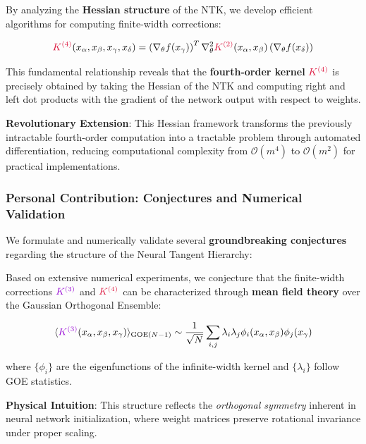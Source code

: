 \documentclass[a4paper]{article}
\theoremstyle{plain}
\theoremstyle{definition}
\theoremstyle{remark}
\begin{document}
\begin{tcolorbox}[colback=kernelcolor!10,colframe=kernelcolor!60!black,title={\textbf{Hessian Framework: Computational Breakthrough}},enhanced,drop shadow]
By analyzing the \textbf{Hessian structure} of the NTK, we develop efficient algorithms for computing finite-width corrections:

\begin{equation}
\label{eq:hessian_ntk_k4}
\textcolor{kernelcolor}{K^{(4)}}(x_\alpha, x_\beta, x_\gamma, x_\delta) = \left(\nabla_\theta f(x_\gamma)\right)^T \nabla^2_{\theta} \textcolor{kernelcolor}{K^{(2)}}(x_\alpha, x_\beta) \left(\nabla_\theta f(x_\delta)\right)
\end{equation}

This fundamental relationship reveals that the \textbf{fourth-order kernel} $\textcolor{kernelcolor}{K^{(4)}}$ is precisely obtained by taking the Hessian of the NTK and computing right and left dot products with the gradient of the network output with respect to weights.

\textbf{Revolutionary Extension}: This Hessian framework transforms the previously intractable fourth-order computation into a tractable problem through automated differentiation, reducing computational complexity from $\mathcal{O}(m^4)$ to $\mathcal{O}(m^2)$ for practical implementations.
\end{tcolorbox}

\subsubsection{Personal Contribution: Conjectures and Numerical Validation}

We formulate and numerically validate several \textbf{groundbreaking conjectures} regarding the structure of the Neural Tangent Hierarchy:

\begin{tcolorbox}[colback=kernelcolor!10,colframe=kernelcolor!60!black,title={\textbf{Conjecture: Mean GOE Structure for NTH Corrections}},enhanced,drop shadow]
Based on extensive numerical experiments, we conjecture that the finite-width corrections $\textcolor{k3color}{K^{(3)}}$ and $\textcolor{kernelcolor}{K^{(4)}}$ can be characterized through \textbf{mean field theory} over the Gaussian Orthogonal Ensemble:

\begin{equation}
\label{eq:goe_mean_conjecture}
\langle \textcolor{k3color}{K^{(3)}}(x_\alpha, x_\beta, x_\gamma) \rangle_{\text{GOE}(N-1)} \sim \frac{1}{\sqrt{N}} \sum_{i,j} \lambda_i \lambda_j \phi_i(x_\alpha, x_\beta) \phi_j(x_\gamma)
\end{equation}

where $\{\phi_i\}$ are the eigenfunctions of the infinite-width kernel and $\{\lambda_i\}$ follow GOE statistics.

\textbf{Physical Intuition}: This structure reflects the \textit{orthogonal symmetry} inherent in neural network initialization, where weight matrices preserve rotational invariance under proper scaling.
\end{tcolorbox}
\end{document}
